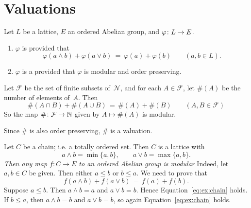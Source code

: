 \documentclass[main.tex]{subfiles}
\begin{document}
\section{Valuations}
\noindent
%
%
\begin{dfn}
Let $L$ be a lattice, $E$ an ordered Abelian group,
and $\varphi\colon L \rightarrow E$.
\begin{enumerate}
\item
$\varphi$ is  provided that
\begin{equation*}
\varphi(a\wedge b) + \varphi(a \vee b)
\ =\ 
\varphi(a) + \varphi(b)
\qquad(a,b\in L).
\end{equation*}

\item
$\varphi$ is a 
provided that $\varphi$ is modular and order preserving.
\end{enumerate}
\end{dfn}

\begin{ex}
Let $\mathcal{F}$ be the set of finite subsets of~$\mathcal{N}$,
and for each $A\in \mathcal{F}$,
let $\#(A)$ be the number of elements of~$A$.
Then
\begin{equation*}
\#(A\cap B) + \#(A\cup B) \,=\, \#(A) + \#(B)
\qquad(A,B\in\mathcal{F})
\end{equation*}
So the map $\#\colon \mathcal{F}\rightarrow \mathbb{N}$
given by $A\mapsto \#(A)$ is modular.

Since $\#$ is also order preserving,
$\#$ is a valuation.
\end{ex}

\begin{ex}
Let $C$ be a chain;
i.e. a totally ordered set.
Then $C$ is a lattice with
\begin{equation*}
a\wedge b = \min\{a,b\},
 \qquad 
a\vee b = \max\{a,b\}.
\end{equation*}
\emph{Then any map $f\colon C\rightarrow E$
to an ordered Abelian group is modular}
Indeed,
let $a,b\in C$ be given.
Then either $a\leq b$ or $b\leq a$.
We need to prove that 
\begin{equation}
\label{eq:ex:chain}
f(a\wedge b) + f(a \vee b) \,=\, f(a) + f(b).
\end{equation}
Suppose $a\leq b$. Then $a\wedge b = a$ and $a \vee b= b$.
Hence Equation~\eqref{eq:ex:chain} holds.  
If $b\leq a$, then $a\wedge b = b$ and $a \vee b = b$,
so again Equation~\eqref{eq:ex:chain} holds.
\end{ex}
\end{document}
